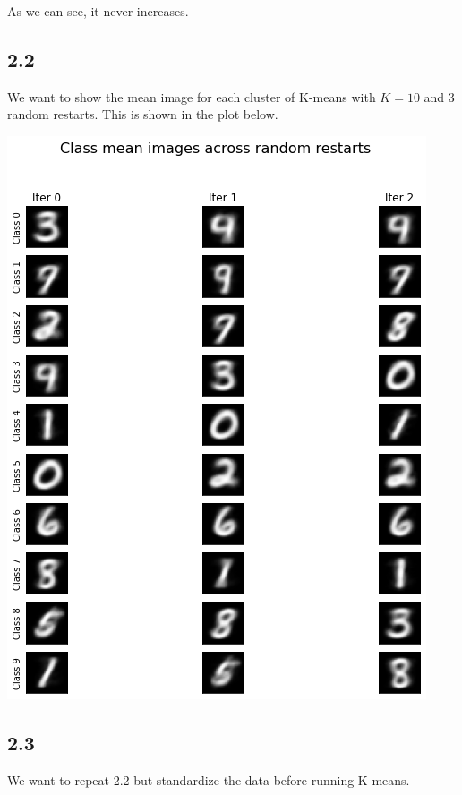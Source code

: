 \documentclass[submit]{harvardml}
\begin{document}
As we can see, it never increases.

\newpage
\subsection*{2.2}
We want to show the mean image for each cluster of K-means with $K = 10$ and $3$ random restarts. This is shown in the plot below.

\includegraphics[scale=0.5]{plots/kmeans.png}

\newpage
\subsection*{2.3}
We want to repeat 2.2 but standardize the data before running K-means.
\end{document}
